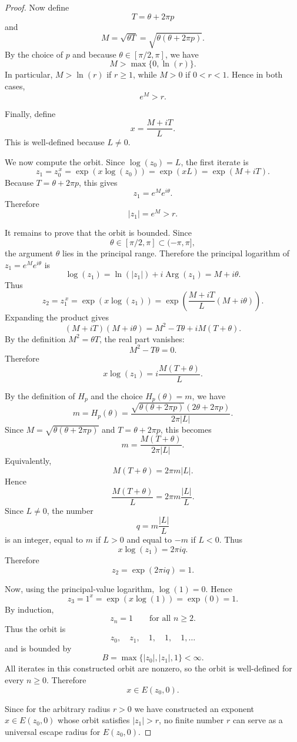 \documentclass[12pt,a4paper]{amsart}
\theoremstyle{remark}
\begin{document}
\begin{proof}
Now define
\[
T=\theta+2\pi p
\]
and
\[
M=\sqrt{\theta T}
=
\sqrt{\theta(\theta+2\pi p)}.
\]
By the choice of $p$ and because $\theta\in[\pi/2,\pi]$, we have
\[
M>\max\{0,\ln(r)\}.
\]
In particular, $M>\ln(r)$ if $r\ge 1$, while $M>0$ if $0<r<1$. Hence in both
cases,
\[
e^M>r.
\]

Finally, define
\[
x=\frac{M+iT}{L}.
\]
This is well-defined because $L\ne 0$.

We now compute the orbit. Since $\log(z_0)=L$, the first iterate is
\[
z_1
=
z_0^{\,x}
=
\exp(x\log(z_0))
=
\exp(xL)
=
\exp(M+iT).
\]
Because $T=\theta+2\pi p$, this gives
\[
z_1=e^M e^{i\theta}.
\]
Therefore
\[
|z_1|=e^M>r.
\]

It remains to prove that the orbit is bounded. Since
\[
\theta\in[\pi/2,\pi]\subset(-\pi,\pi],
\]
the argument $\theta$ lies in the principal range. Therefore the principal
logarithm of $z_1=e^M e^{i\theta}$ is
\[
\log(z_1)
=
\ln(|z_1|)+i\operatorname{Arg}(z_1)
=
M+i\theta.
\]
Thus
\[
z_2
=
z_1^{\,x}
=
\exp(x\log(z_1))
=
\exp\left(\frac{M+iT}{L}(M+i\theta)\right).
\]
Expanding the product gives
\[
(M+iT)(M+i\theta)
=
M^2-T\theta+iM(T+\theta).
\]
By the definition $M^2=\theta T$, the real part vanishes:
\[
M^2-T\theta=0.
\]
Therefore
\[
x\log(z_1)
=
i\frac{M(T+\theta)}{L}.
\]

By the definition of $H_p$ and the choice $H_p(\theta)=m$, we have
\[
m
=
H_p(\theta)
=
\frac{\sqrt{\theta(\theta+2\pi p)}(2\theta+2\pi p)}
{2\pi |L|}.
\]
Since $M=\sqrt{\theta(\theta+2\pi p)}$ and $T=\theta+2\pi p$, this becomes
\[
m
=
\frac{M(T+\theta)}{2\pi |L|}.
\]
Equivalently,
\[
M(T+\theta)=2\pi m|L|.
\]
Hence
\[
\frac{M(T+\theta)}{L}
=
2\pi m\frac{|L|}{L}.
\]
Since $L\ne 0$, the number
\[
q=m\frac{|L|}{L}
\]
is an integer, equal to $m$ if $L>0$ and equal to $-m$ if $L<0$. Thus
\[
x\log(z_1)=2\pi i q.
\]
Therefore
\[
z_2=\exp(2\pi i q)=1.
\]

Now, using the principal-value logarithm, $\log(1)=0$. Hence
\[
z_3
=
1^x
=
\exp(x\log(1))
=
\exp(0)
=
1.
\]
By induction,
\[
z_n=1
\qquad\text{for all } n\ge 2.
\]
Thus the orbit is
\[
z_0,\quad z_1,\quad 1,\quad 1,\quad 1,\ldots
\]
and is bounded by
\[
B=\max\{|z_0|,|z_1|,1\}<\infty.
\]
All iterates in this constructed orbit are nonzero, so the orbit is
well-defined for every $n\ge 0$. Therefore
\[
x\in E(z_0,0).
\]

Since for the arbitrary radius $r>0$ we have constructed an exponent
$x\in E(z_0,0)$ whose orbit satisfies $|z_1|>r$, no finite number $r$ can
serve as a universal escape radius for $E(z_0,0)$.
\end{proof}
\end{document}

